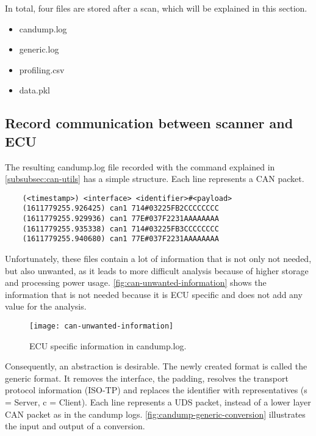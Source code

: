 In total, four files are stored after a scan, which will be explained in this section.

\begin{itemize}
    \item candump.log
    \item generic.log
    \item profiling.csv
    \item data.pkl
\end{itemize}

\subsection{Record communication between scanner and ECU}

The resulting candump.log file recorded with the command explained in \autoref{subsubsec:can-utils} has a simple structure. Each line represents a CAN packet.

\begin{samepage}
\begin{verbatim}
    (<timestamp>) <interface> <identifier>#<payload>
    (1611779255.926425) can1 714#03225FB2CCCCCCCC
    (1611779255.929936) can1 77E#037F2231AAAAAAAA
    (1611779255.935338) can1 714#03225FB3CCCCCCCC
    (1611779255.940680) can1 77E#037F2231AAAAAAAA
\end{verbatim}
\end{samepage}

Unfortunately, these files contain a lot of information that is not only not needed, but also unwanted, as it leads to more difficult analysis because of higher storage and processing power usage. \autoref{fig:can-unwanted-information} shows the information that is not needed because it is ECU specific and does not add any value for the analysis.

\begin{figure}[H]
    \centering
    \texttt{[image: can-unwanted-information]}
    \caption{ECU specific information in candump.log.}
    \label{fig:can-unwanted-information}
\end{figure}

Consequently, an abstraction is desirable. The newly created format is called the generic format. It removes the interface, the padding, resolves the transport protocol information (ISO-TP) and replaces the identifier with representatives (s = Server, c = Client). Each line represents a UDS packet, instead of a lower layer CAN packet as in the candump logs. \autoref{fig:candump-generic-conversion} illustrates the input and output of a conversion.

